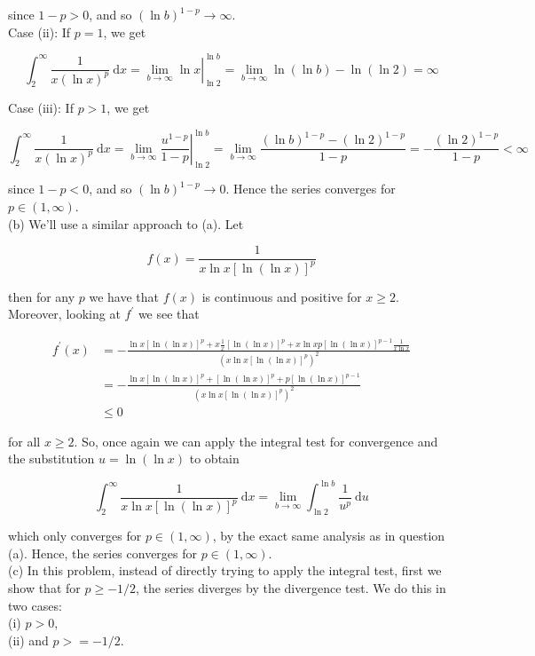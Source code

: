 \documentclass[10pt]{article}
\begin{document}
since $1-p>0$, and so $(\ln b)^{1-p} \rightarrow \infty$.\\
Case (ii): If $p=1$, we get

$$
\int_{2}^{\infty} \frac{1}{x(\ln x)^{p}} \mathrm{~d} x=\left.\lim _{b \rightarrow \infty} \ln x\right|_{\ln 2} ^{\ln b}=\lim _{b \rightarrow \infty} \ln (\ln b)-\ln (\ln 2)=\infty
$$

Case (iii): If $p>1$, we get

$$
\int_{2}^{\infty} \frac{1}{x(\ln x)^{p}} \mathrm{~d} x=\left.\lim _{b \rightarrow \infty} \frac{u^{1-p}}{1-p}\right|_{\ln 2} ^{\ln b}=\lim _{b \rightarrow \infty} \frac{(\ln b)^{1-p}-(\ln 2)^{1-p}}{1-p}=-\frac{(\ln 2)^{1-p}}{1-p}<\infty
$$

since $1-p<0$, and so $(\ln b)^{1-p} \rightarrow 0$. Hence the series converges for $p \in(1, \infty)$.\\
(b) We'll use a similar approach to (a). Let

$$
f(x)=\frac{1}{x \ln x[\ln (\ln x)]^{p}}
$$

then for any $p$ we have that $f(x)$ is continuous and positive for $x \geq 2$. Moreover, looking at $f^{\prime}$ we see that

$$
\begin{aligned}
f^{\prime}(x) & =-\frac{\ln x[\ln (\ln x)]^{p}+x \frac{1}{x}[\ln (\ln x)]^{p}+x \ln x p[\ln (\ln x)]^{p-1} \frac{1}{x \ln x}}{\left(x \ln x[\ln (\ln x)]^{p}\right)^{2}} \\
& =-\frac{\ln x[\ln (\ln x)]^{p}+[\ln (\ln x)]^{p}+p[\ln (\ln x)]^{p-1}}{\left(x \ln x[\ln (\ln x)]^{p}\right)^{2}} \\
& \leq 0
\end{aligned}
$$

for all $x \geq 2$. So, once again we can apply the integral test for convergence and the substitution $u=\ln (\ln x)$ to obtain

$$
\int_{2}^{\infty} \frac{1}{x \ln x[\ln (\ln x)]^{p}} \mathrm{~d} x=\lim _{b \rightarrow \infty} \int_{\ln 2}^{\ln b} \frac{1}{u^{p}} \mathrm{~d} u
$$

which only converges for $p \in(1, \infty)$, by the exact same analysis as in question (a). Hence, the series converges for $p \in(1, \infty)$.\\
(c) In this problem, instead of directly trying to apply the integral test, first we show that for $p \geq-1 / 2$, the series diverges by the divergence test. We do this in two cases:\\
(i) $p>0$,\\
(ii) and $p>=-1 / 2$.
\end{document}
